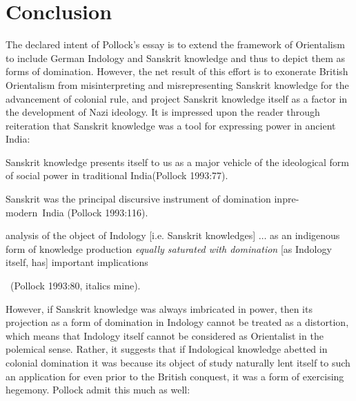 \section*{Conclusion}

The declared intent of Pollock’s essay is to extend the framework of Orientalism to include German Indology and Sanskrit knowledge and thus to depict them as forms of domination. However, the net result of this effort is to exonerate British Orientalism from misinterpreting and misrepresenting Sanskrit knowledge for the advancement of colonial rule, and project Sanskrit knowledge itself as a factor in the development of Nazi ideology. It is impressed upon the reader through reiteration that Sanskrit knowledge was a tool for expressing power in ancient India:
\begin{myquote}
Sanskrit knowledge presents itself to us as a major vehicle of the ideological form of social power in traditional India\hfill (Pollock 1993:77).
\end{myquote}

\begin{myquote}
Sanskrit was the principal discursive instrument of domination in\break pre-modern~India \hfill(Pollock 1993:116).
\end{myquote}

\begin{myquote}
[An] analysis of the object of Indology [i.e. Sanskrit knowledges] $\ldots$ as an indigenous form of knowledge production {\sl equally saturated with domination} [as Indology itself, has] important implications 

~\hfill(Pollock 1993:80, italics mine). 
\end{myquote}
However, if Sanskrit knowledge was always imbricated in power, then its projection as a form of domination in Indology cannot be treated as a distortion, which means that Indology itself cannot be considered as Orientalist in the polemical sense. Rather, it suggests that if Indological knowledge abetted in colonial domination it was because its object of study naturally lent itself to such an application for even prior to the British conquest, it was a form of exercising hegemony. Pollock admit this much as well:
\newpage

